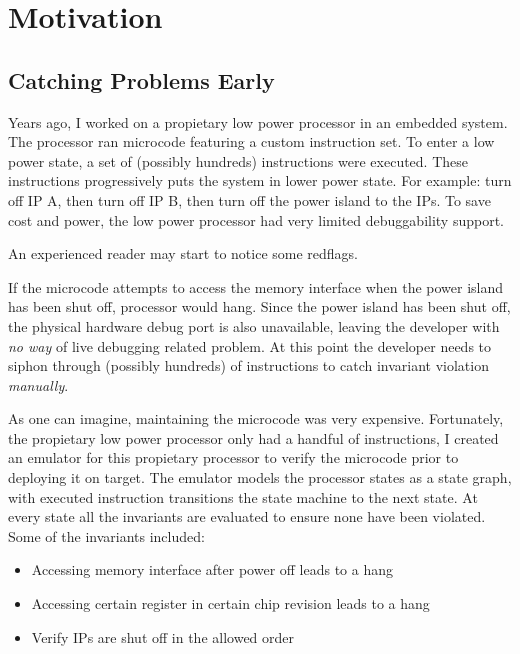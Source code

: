 \chapter{Motivation}

\section{Catching Problems Early}

Years ago, I worked on a propietary low power processor in an embedded system.
The processor ran microcode featuring a custom instruction set. To enter a low
power state, a set of (possibly hundreds) instructions were executed. These
instructions progressively puts the system in lower power state. For example:
turn off IP A, then turn off IP B, then turn off the power island to the IPs. To
save cost and power, the low power processor had very limited debuggability
support.\newline

An experienced reader may start to notice some redflags.\newline

If the microcode attempts to access the memory interface when the power island
has been shut off, processor would hang. Since the power island has been shut
off, the physical hardware debug port is also unavailable, leaving the developer
with \textit{no way} of live debugging related problem. At this point the
developer needs to siphon through (possibly hundreds) of instructions to catch
invariant violation \textit{manually}.\newline

As one can imagine, maintaining the microcode was very expensive. Fortunately,
the propietary low power processor only had a handful of instructions, I created
an emulator for this propietary processor to verify the microcode prior to
deploying it on target. The emulator models the processor states as a state
graph, with executed instruction transitions the state machine to the next
state. At every state all the invariants are evaluated to ensure none have been
violated. Some of the invariants included:
\begin{itemize}
    \item Accessing memory interface after power off leads to a hang
    \item Accessing certain register in certain chip revision leads to a hang 
    \item Verify IPs are shut off in the allowed order
\end{itemize}


